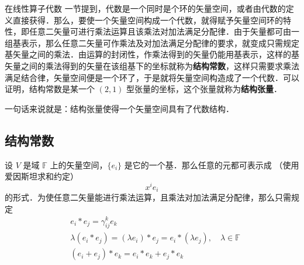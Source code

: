 在线性算子代数 一节提到，代数是一个同时是个环的矢量空间，或者由代数的定义直接获得．那么，要使一个矢量空间构成一个代数，就得赋予矢量空间环的特性，即任意二矢量可进行乘法运算且该乘法对加法满足分配律．由于矢量都可由一组基表示，那么任意二矢量可作乘法及对加法满足分配律的要求，就变成只需规定基矢量之间的乘法．由运算的封闭性，作乘法得到的矢量仍能用基表示，这样的基矢量之间的乘法得到的矢量在该组基下的坐标就称为\textbf{结构常数}，这样只需要求乘法满足结合律，矢量空间便是一个环了，于是就将矢量空间构造成了一个代数．可以证明，结构常数是某一个 $(2,1)$ 型张量的坐标，这个张量就称为\textbf{结构张量}． 

一句话来说就是：结构张量使得一个矢量空间具有了代数结构．

\subsection{结构常数}
设 $V$ 是域 $\mathbb F$ 上的矢量空间，$\{e_i\}$ 是它的一个基．那么任意的元都可表示成 （使用爱因斯坦求和约定）
\begin{equation}
x^i e_i
\end{equation}
的形式．为使任意二矢量能进行乘法运算，且乘法对加法满足分配律，那么只需规定
\begin{equation}
\begin{aligned}
&e_i*e_j=\gamma_{ij}^k e_k\\
&\lambda(e_i*e_j)=(\lambda e_i)*e_j=e_i*(\lambda e_j),\quad \lambda\in\mathbb F\\
&(e_i+e_j)*e_k=e_i*e_k+e_j*e_k
\end{aligned}
\end{equation}
